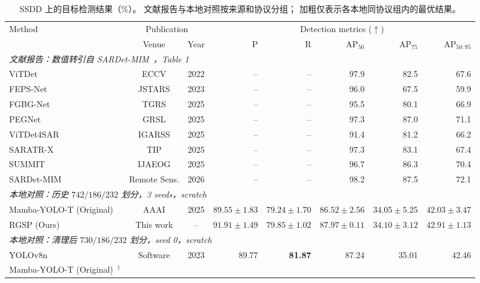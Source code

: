 \begin{table}[!t]
\centering
\small
\setlength{\tabcolsep}{3.5pt}
\renewcommand{\arraystretch}{1.10}
\caption{SSDD 上的目标检测结果（\%）。
文献报告与本地对照按来源和协议分组；
加粗仅表示各本地同协议组内的最优结果。}
\label{tab:ssdd_detection_comparison}
\begin{tabular*}{\textwidth}{@{\extracolsep{\fill}}lccrrrrr}
\toprule
\multirow{2}{*}{Method}
& \multicolumn{2}{c}{Publication}
& \multicolumn{5}{c}{Detection metrics ($\uparrow$)} \\
\cmidrule(lr){2-3}\cmidrule(lr){4-8}
& Venue & Year & P & R
& AP$_{50}$ & AP$_{75}$ & AP$_{50:95}$ \\
\midrule
\multicolumn{8}{l}{\textit{文献报告：数值转引自 SARDet-MIM~\cite{sardetmim2026}，Table 1}} \\
ViTDet~\cite{vitdet2022}
& ECCV & 2022
& -- & -- & 97.9 & 82.5 & 67.6 \\
FEPS-Net~\cite{feps2023}
& JSTARS & 2023
& -- & -- & 96.0 & 67.5 & 59.9 \\
FGBG-Net~\cite{fgbg2025}
& TGRS & 2025
& -- & -- & 95.5 & 80.1 & 66.9 \\
PEGNet~\cite{pegnet2025}
& GRSL & 2025
& -- & -- & 97.3 & 87.0 & 71.1 \\
ViTDet4SAR~\cite{vitdet4sar2025}
& IGARSS & 2025
& -- & -- & 91.4 & 81.2 & 66.2 \\
SARATR-X~\cite{saratrx2025}
& TIP & 2025
& -- & -- & 97.3 & 83.1 & 67.4 \\
SUMMIT~\cite{summit2025}
& IJAEOG & 2025
& -- & -- & 96.7 & 86.3 & 70.4 \\
SARDet-MIM~\cite{sardetmim2026}
& Remote Sens. & 2026
& -- & -- & 98.2 & 87.5 & 72.1 \\
\midrule
\multicolumn{8}{l}{\textit{本地对照：历史 $742/186/232$ 划分，3 seeds，scratch}} \\
Mamba-YOLO-T (Original)~\cite{mambayolo2024}
& AAAI & 2025
& $89.55\pm1.83$ & $79.24\pm1.70$ & $86.52\pm2.56$ & $34.05\pm5.25$ & $42.03\pm3.47$ \\
RGSP (Ours)
& This work & --
& $\mathbf{91.91\pm1.49}$ & $\mathbf{79.85\pm1.02}$ & $\mathbf{87.97\pm0.11}$ & $\mathbf{34.10\pm3.12}$ & $\mathbf{42.91\pm1.13}$ \\
\midrule
\multicolumn{8}{l}{\textit{本地对照：清理后 $730/186/232$ 划分，seed 0，scratch}} \\
YOLOv8n~\cite{yolov82023}
& Software & 2023
& 89.77 & \textbf{81.87} & 87.24 & 35.01 & 42.46 \\
Mamba-YOLO-T (Original)~\cite{mambayolo2024}$^{\dagger}$

\end{tabular*}
\end{table}
